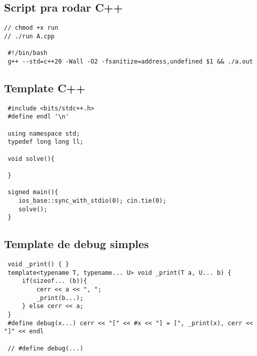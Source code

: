 \documentclass[11pt, a4paper, twoside]{article}
\begin{document}
\subsection{Script pra rodar C++}
\begin{lstlisting}
// chmod +x run
// ./run A.cpp

 #!/bin/bash
 g++ --std=c++20 -Wall -O2 -fsanitize=address,undefined $1 && ./a.out
\end{lstlisting}

\subsection{Template C++}
\begin{lstlisting}
 #include <bits/stdc++.h>
 #define endl '\n'
 
 using namespace std;
 typedef long long ll;
 
 void solve(){
 
 }
 
 signed main(){
 	ios_base::sync_with_stdio(0); cin.tie(0);
 	solve();
 }
\end{lstlisting}

\subsection{Template de debug simples}
\begin{lstlisting}
 void _print() { }
 template<typename T, typename... U> void _print(T a, U... b) {
     if(sizeof... (b)){
         cerr << a << ", ";
         _print(b...);
     } else cerr << a;
 }
 #define debug(x...) cerr << "[" << #x << "] = [", _print(x), cerr << "]" << endl
 
 // #define debug(...)
\end{lstlisting}
\end{document}
